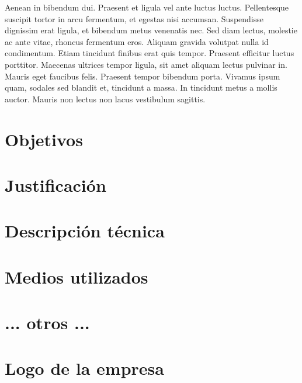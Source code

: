 \documentclass[a4paper,
	11pt,
	parskip=full,
	bibliography=totoc,
	twoside
	]{scrartcl}
\let\oldsection\section
\def\section{\cleardoubleoddpage\oldsection}
\renewcommand{\sectionmark}[1]{\markright{\thesection.\ #1}}
\begin{document}
	Aenean in bibendum dui. Praesent et ligula vel ante luctus luctus. Pellentesque suscipit tortor in arcu fermentum, et egestas nisi accumsan. Suspendisse dignissim erat ligula, et bibendum metus venenatis nec. Sed diam lectus, molestie ac ante vitae, rhoncus fermentum eros. Aliquam gravida volutpat nulla id condimentum. Etiam tincidunt finibus erat quis tempor. Praesent efficitur luctus porttitor. Maecenas ultrices tempor ligula, sit amet aliquam lectus pulvinar in. Mauris eget faucibus felis. Praesent tempor bibendum porta. Vivamus ipsum quam, sodales sed blandit et, tincidunt a massa. In tincidunt metus a mollis auctor. Mauris non lectus non lacus vestibulum sagittis. 

\section{Objetivos}

\section{Justificación}

\section{Descripción técnica}
	
\section{Medios utilizados}

\section{ ... otros ...}

\cleardoubleoddpage
	\renewcommand{\sectionmark}[1]{}
\begin{thebibliography}{9}
	\raggedright
	
\end{thebibliography}
\markright{\appendixname}

\cleardoubleoddpage
\appendix
{}

\section{Logo de la empresa}
	\FloatBarrier
\end{document}
